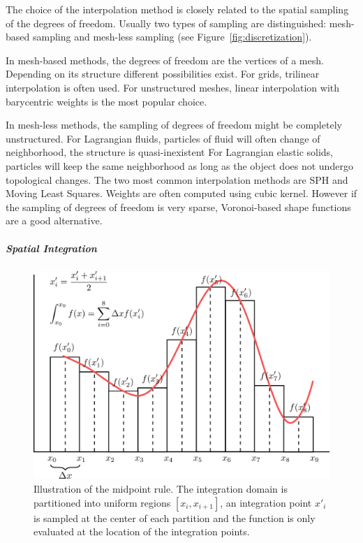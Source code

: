 The choice of the interpolation method is closely related to the spatial sampling of the degrees of freedom. Usually two types of sampling are distinguished: mesh-based sampling and mesh-less sampling (see Figure~\ref{fig:discretization}).

In mesh-based methods, the degrees of freedom are the vertices of a mesh. Depending on its structure different possibilities exist. For grids, trilinear interpolation is often used. For unstructured meshes, linear interpolation with barycentric weights is the most popular choice.

In mesh-less methods, the sampling of degrees of freedom might be completely unstructured. For Lagrangian fluids, particles of fluid will often change of neighborhood, the structure is quasi-inexistent For Lagrangian elastic solids, particles will keep the same neighborhood as long as the object does not undergo topological changes. The two most common interpolation methods are SPH and Moving Least Squares. Weights are often computed using cubic kernel. However if the sampling of degrees of freedom is very sparse, Voronoi-based shape functions are a good alternative.

\subparagraph{Spatial Integration}

\begin{figure}[!ht]
\centering
\includegraphics[scale=1.0]{images/continuum_mechanics/spatialIntegration.png}
\caption[STAR mechanics: Spatial integration]{\label{fig:spatialIntegration} Illustration of the midpoint rule. The integration domain is partitioned into uniform regions $\left[x_{i}, x_{i+1}\right]$, an integration point $x'_{i}$ is sampled at the center of each partition and the function is only evaluated at the location of the integration points.}
\end{figure}

